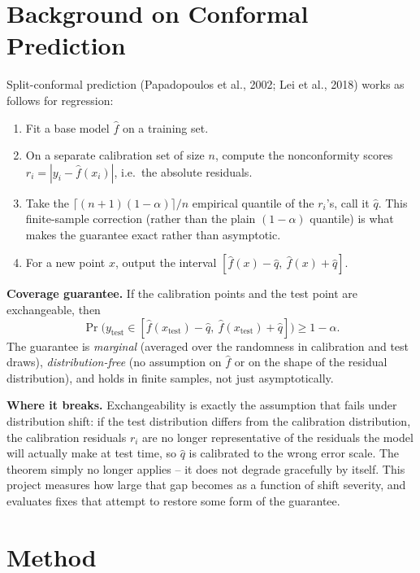 \documentclass[11pt]{article}
\begin{document}
\section{Background on Conformal Prediction}

Split-conformal prediction (Papadopoulos et al., 2002; Lei et al., 2018) works as
follows for regression:

\begin{enumerate}
  \item Fit a base model $\hat f$ on a training set.
  \item On a separate calibration set of size $n$, compute the nonconformity scores
    $r_i = |y_i - \hat f(x_i)|$, i.e.\ the absolute residuals.
  \item Take the $\lceil (n+1)(1-\alpha) \rceil / n$ empirical quantile of the
    $r_i$'s, call it $\hat q$. This finite-sample correction (rather than the plain
    $(1-\alpha)$ quantile) is what makes the guarantee exact rather than
    asymptotic.
  \item For a new point $x$, output the interval $[\hat f(x) - \hat q,\ \hat f(x) +
    \hat q]$.
\end{enumerate}

\textbf{Coverage guarantee.} If the calibration points and the test point are
exchangeable, then
\[
  \Pr\big(y_{\text{test}} \in [\hat f(x_{\text{test}}) - \hat q,\ \hat f(x_{\text{test}}) + \hat q]\big) \ge 1-\alpha .
\]
The guarantee is \emph{marginal} (averaged over the randomness in calibration and
test draws), \emph{distribution-free} (no assumption on $\hat f$ or on the shape of
the residual distribution), and holds in finite samples, not just asymptotically.

\textbf{Where it breaks.} Exchangeability is exactly the assumption that fails under
distribution shift: if the test distribution differs from the calibration
distribution, the calibration residuals $r_i$ are no longer representative of the
residuals the model will actually make at test time, so $\hat q$ is calibrated to
the wrong error scale. The theorem simply no longer applies -- it does not degrade
gracefully by itself. This project measures how large that gap becomes as a function
of shift severity, and evaluates fixes that attempt to restore some form of the
guarantee.

\section{Method}
\end{document}
